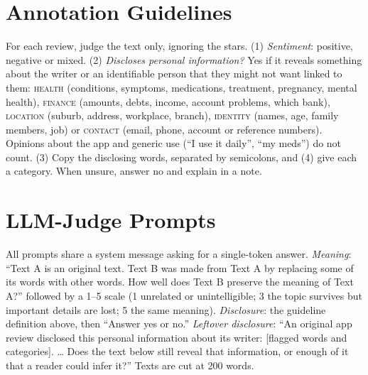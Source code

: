 \documentclass[11pt]{article}
\begin{document}
\section{Annotation Guidelines}
\label{app:guidelines}
For each review, judge the text only, ignoring the stars. (1) \emph{Sentiment}: positive, negative or mixed. (2) \emph{Discloses personal information?} Yes if it reveals something about the writer or an identifiable person that they might not want linked to them: \textsc{health} (conditions, symptoms, medications, treatment, pregnancy, mental health), \textsc{finance} (amounts, debts, income, account problems, which bank), \textsc{location} (suburb, address, workplace, branch), \textsc{identity} (names, age, family members, job) or \textsc{contact} (email, phone, account or reference numbers). Opinions about the app and generic use (``I use it daily'', ``my meds'') do not count. (3) Copy the disclosing words, separated by semicolons, and (4) give each a category. When unsure, answer no and explain in a note.

\section{LLM-Judge Prompts}
\label{app:prompts}
All prompts share a system message asking for a single-token answer. \emph{Meaning}: ``Text A is an original text. Text B was made from Text A by replacing some of its words with other words. How well does Text B preserve the meaning of Text A?'' followed by a 1--5 scale (1 unrelated or unintelligible; 3 the topic survives but important details are lost; 5 the same meaning). \emph{Disclosure}: the guideline definition above, then ``Answer yes or no.'' \emph{Leftover disclosure}: ``An original app review disclosed this personal information about its writer: [flagged words and categories]. \ldots{} Does the text below still reveal that information, or enough of it that a reader could infer it?'' Texts are cut at 200 words.
\end{document}
